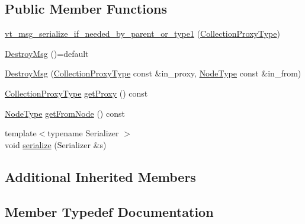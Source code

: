 \subsection*{Public Member Functions}
\begin{DoxyCompactItemize}
\item 
\hyperlink{structvt_1_1vrt_1_1collection_1_1_destroy_msg_ae9f2ea1d96f67bdb78a30fe8908eb690}{vt\+\_\+msg\+\_\+serialize\+\_\+if\+\_\+needed\+\_\+by\+\_\+parent\+\_\+or\+\_\+type1} (\hyperlink{structvt_1_1vrt_1_1collection_1_1_destroy_msg_a5bf089cacadf94e55e9ae797c4cd0462}{Collection\+Proxy\+Type})
\item 
\hyperlink{structvt_1_1vrt_1_1collection_1_1_destroy_msg_a3c7d44bb51d25e0853cb56c4403c2666}{Destroy\+Msg} ()=default
\item 
\hyperlink{structvt_1_1vrt_1_1collection_1_1_destroy_msg_a7a4d9c50086362cd44933fc4c2b6f53d}{Destroy\+Msg} (\hyperlink{structvt_1_1vrt_1_1collection_1_1_destroy_msg_a5bf089cacadf94e55e9ae797c4cd0462}{Collection\+Proxy\+Type} const \&in\+\_\+proxy, \hyperlink{namespacevt_a866da9d0efc19c0a1ce79e9e492f47e2}{Node\+Type} const \&in\+\_\+from)
\item 
\hyperlink{structvt_1_1vrt_1_1collection_1_1_destroy_msg_a5bf089cacadf94e55e9ae797c4cd0462}{Collection\+Proxy\+Type} \hyperlink{structvt_1_1vrt_1_1collection_1_1_destroy_msg_a57e8fd346b3298e9472cccbda65ed1d8}{get\+Proxy} () const
\item 
\hyperlink{namespacevt_a866da9d0efc19c0a1ce79e9e492f47e2}{Node\+Type} \hyperlink{structvt_1_1vrt_1_1collection_1_1_destroy_msg_a598fc97dc1277e545b741e1272da588c}{get\+From\+Node} () const
\item 
{\footnotesize template$<$typename Serializer $>$ }\\void \hyperlink{structvt_1_1vrt_1_1collection_1_1_destroy_msg_a112e71fb4a34cf0229b78ad36aa4d4ef}{serialize} (Serializer \&s)
\end{DoxyCompactItemize}
\subsection*{Additional Inherited Members}


\subsection{Member Typedef Documentation}
\mbox{\label{structvt_1_1vrt_1_1collection_1_1_destroy_msg_a5bf089cacadf94e55e9ae797c4cd0462}} 
